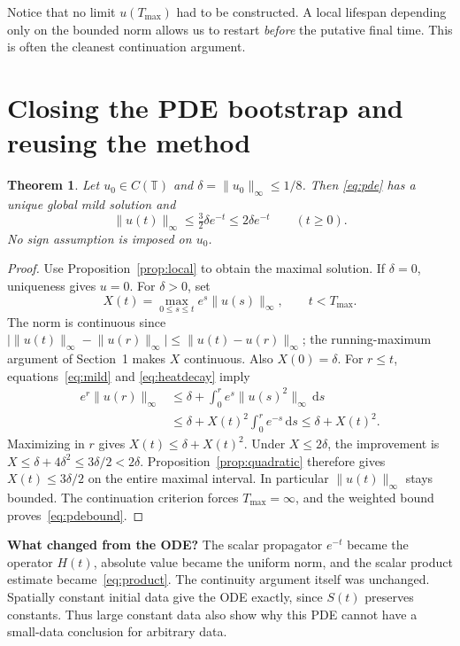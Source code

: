 \documentclass[a4paper,10pt]{article}
\numberwithin{equation}{section}
\newtheorem{theorem}{Theorem}[section]
\theoremstyle{definition}
\theoremstyle{remark}
\newcommand{\T}{\mathbb T}
\newcommand{\norm}[1]{\lVert#1\rVert}
\newcommand{\abs}[1]{\lvert#1\rvert}
\newcommand{\dd}{\,\mathrm d}
\newcommand{\Tmax}{T_{\max}}
\newcommand{\pageheading}[1]{\section{#1}}
\begin{document}
Notice that no limit $u(\Tmax)$ had to be constructed. A local lifespan
depending only on the bounded norm allows us to restart \emph{before} the
putative final time. This is often the cleanest continuation argument.

\newpage
\pageheading{Closing the PDE bootstrap and reusing the method}
\begin{theorem}\label{thm:pde}
Let $u_0\in C(\T)$ and $\delta=\norm{u_0}_\infty\leq1/8$. Then
\eqref{eq:pde} has a unique global mild solution and
\begin{equation}\label{eq:pdebound}
\norm{u(t)}_\infty\leq\tfrac32\delta e^{-t}\leq2\delta e^{-t}
\qquad(t\geq0).
\end{equation}
No sign assumption is imposed on $u_0$.
\end{theorem}
\begin{proof}
Use Proposition~\ref{prop:local} to obtain the maximal solution. If
$\delta=0$, uniqueness gives $u=0$. For $\delta>0$, set
\[
X(t)=\max_{0\leq s\leq t}e^s\norm{u(s)}_\infty,\qquad t<\Tmax.
\]
The norm is continuous since
$\abs{\norm{u(t)}_\infty-\norm{u(r)}_\infty}\leq\norm{u(t)-u(r)}_\infty$;
the running-maximum argument of Section~1 makes $X$ continuous. Also
$X(0)=\delta$. For $r\leq t$, equations~\eqref{eq:mild} and
\eqref{eq:heatdecay} imply
\begin{align*}
e^r\norm{u(r)}_\infty
&\leq\delta+\int_0^r e^s\norm{u(s)^2}_\infty\dd s\\
&\leq\delta+X(t)^2\int_0^r e^{-s}\dd s
 \leq\delta+X(t)^2.
\end{align*}
Maximizing in $r$ gives $X(t)\leq\delta+X(t)^2$. Under $X\leq2\delta$,
the improvement is $X\leq\delta+4\delta^2\leq3\delta/2<2\delta$.
Proposition~\ref{prop:quadratic} therefore gives $X(t)\leq3\delta/2$ on
the entire maximal interval. In particular $\norm{u(t)}_\infty$ stays
bounded. The continuation criterion forces $\Tmax=\infty$, and the
weighted bound proves~\eqref{eq:pdebound}.
\end{proof}

\textbf{What changed from the ODE?} The scalar propagator $e^{-t}$ became
the operator $H(t)$, absolute value became the uniform norm, and the scalar
product estimate became~\eqref{eq:product}. The continuity argument itself
was unchanged. Spatially constant initial data give the ODE exactly, since
$S(t)$ preserves constants. Thus large constant data also show why this PDE
cannot have a small-data conclusion for arbitrary data.
\end{document}
